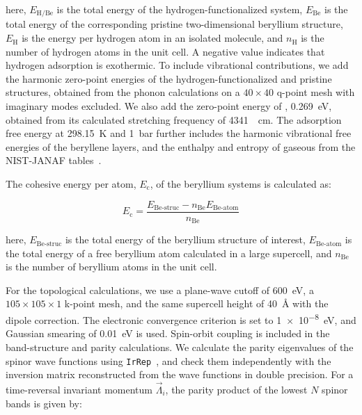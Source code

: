 here,
$E_{\mathrm{H/Be}}$ is the total energy of the hydrogen-functionalized system,
$E_{\mathrm{Be}}$ is the total energy of the corresponding pristine two-dimensional beryllium structure,
$E_{\mathrm{H}}$ is the energy per hydrogen atom in an isolated  molecule,
and $n_{\mathrm{H}}$ is the number of hydrogen atoms in the unit cell.
A negative value indicates that hydrogen adsorption is exothermic.
To include vibrational contributions,
we add the harmonic zero-point energies of the hydrogen-functionalized and pristine structures,
obtained from the phonon calculations on a $40 \times 40$ q-point mesh with imaginary modes excluded.
We also add the zero-point energy of ,
\qty{0.269}{\electronvolt},
obtained from its calculated stretching frequency of \qty{4341}{\per\centi\metre}.
The adsorption free energy at \qty{298.15}{\kelvin} and \qty{1}{\bar} further includes the harmonic vibrational free energies of the beryllene layers,
and the enthalpy and entropy of gaseous  from the NIST-JANAF tables~\cite{chase1998nist}.

The cohesive energy per atom,
$E_{\mathrm{c}}$,
of the beryllium systems is calculated as:

\begin{equation}
    E_{\mathrm{c}} =
    \frac{E_{\mathrm{Be\text{-}struc}}-n_{\mathrm{Be}}E_{\mathrm{Be\text{-}atom}}}{n_{\mathrm{Be}}}
\label{eq:proj3_cohesive_energy}
\end{equation}

here,
$E_{\mathrm{Be\text{-}struc}}$ is the total energy of the beryllium structure of interest,
$E_{\mathrm{Be\text{-}atom}}$ is the total energy of a free beryllium atom calculated in a large supercell,
and $n_{\mathrm{Be}}$ is the number of beryllium atoms in the unit cell.

For the topological calculations,
we use a plane-wave cutoff of \qty{600}{\electronvolt},
a $105 \times 105 \times 1$ k-point mesh,
and the same supercell height of \qty{40}{\angstrom} with the dipole correction.
The electronic convergence criterion is set to \qty{1e-8}{\electronvolt},
and Gaussian smearing of \qty{0.01}{\electronvolt} is used.
Spin-orbit coupling is included in the band-structure and parity calculations.
We calculate the parity eigenvalues of the spinor wave functions using \texttt{IrRep}~\cite{iraola2022irrep},
and check them independently with the inversion matrix reconstructed from the wave functions in double precision.
For a time-reversal invariant momentum $\vec{\Lambda}_i$,
the parity product of the lowest $N$ spinor bands is given by:

